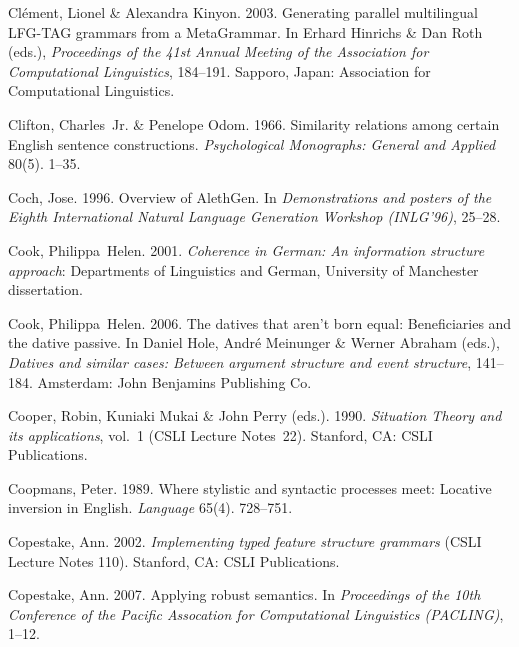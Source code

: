 \begin{thebibliography}{1420}
Cl\'{e}ment, Lionel \& Alexandra Kinyon. 2003.
\newblock Generating parallel multilingual {LFG-TAG} grammars from a
  {MetaGrammar}.
\newblock In Erhard Hinrichs \& Dan Roth (eds.), \emph{Proceedings of the {41st
  Annual Meeting of the Association for Computational Linguistics}}, 184--191.
  Sapporo, Japan: Association for Computational Linguistics.

Clifton, Charles~Jr. \& Penelope Odom. 1966.
\newblock Similarity relations among certain {English} sentence constructions.
\newblock \emph{Psychological Monographs: General and Applied} 80(5). 1--35.

Coch, Jose. 1996.
\newblock Overview of {AlethGen}.
\newblock In \emph{Demonstrations and posters of the {Eighth International
  Natural Language Generation Workshop (INLG'96)}}, 25--28.

Cook, Philippa~Helen. 2001.
\newblock \emph{Coherence in {German}: {An} information structure approach}:
  Departments of Linguistics and German, University of Manchester dissertation.

Cook, Philippa~Helen. 2006.
\newblock The datives that aren't born equal: Beneficiaries and the dative
  passive.
\newblock In Daniel Hole, Andr{\'e} Meinunger \& Werner Abraham (eds.),
  \emph{Datives and similar cases: Between argument structure and event
  structure}, 141--184. Amsterdam: John Benjamins Publishing Co.

Cooper, Robin, Kuniaki Mukai \& John Perry (eds.). 1990.
\newblock \emph{{Situation Theory} and its applications}, vol.~1 (CSLI Lecture
  Notes~22).
\newblock Stanford, CA: CSLI Publications.

Coopmans, Peter. 1989.
\newblock Where stylistic and syntactic processes meet: {Locative} inversion in
  {English}.
\newblock \emph{Language} 65(4). 728--751.

Copestake, Ann. 2002.
\newblock \emph{Implementing typed feature structure grammars} (CSLI Lecture
  Notes 110).
\newblock Stanford, CA: CSLI Publications.

Copestake, Ann. 2007.
\newblock Applying robust semantics.
\newblock In \emph{Proceedings of the {10th Conference of the Pacific
  Assocation for Computational Linguistics (PACLING)}}, 1--12.


\end{thebibliography}
